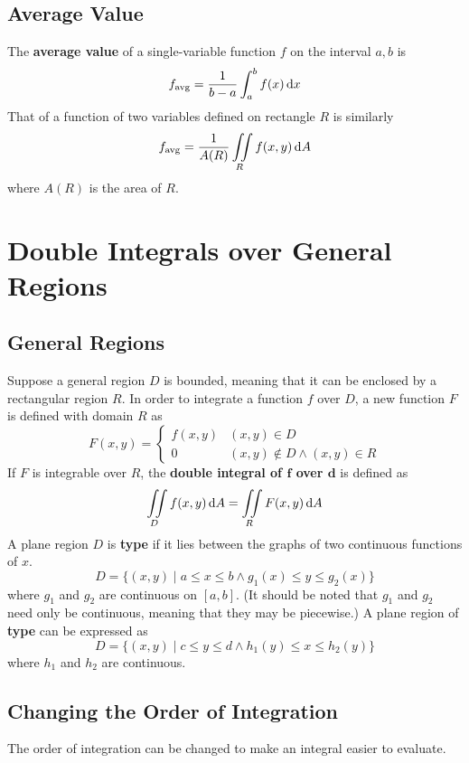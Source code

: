 \documentclass[../Calculus \Roman{3}.tex]{subfiles}
\begin{document}
		\subsection*{Average Value}
			The \textbf{average value} of a single-variable function $f$ on the interval $a, b$ is
				\[f_{\operatorname{avg}} = \frac{1}{b - a}\int_a^b f(x)\,\mathrm{d} x\]
				That of a function of two variables defined on rectangle $R$ is similarly
				\[f_{\operatorname{avg}} = \frac{1}{A(R)}\iint\limits_R f(x, y)\,\mathrm{d} A\]
				where $A(R)$ is the area of $R$.
	\section{Double Integrals over General Regions}
		\subsection*{General Regions}
			Suppose a general region $D$ is bounded, meaning that it can be enclosed by a rectangular region $R$. In order to integrate a function $f$ over $D$, a new function $F$ is defined with domain $R$ as
				\[
					F(x, y) = 
						\begin{cases}
 							f(x, y) & 
 								(x, y) \in D \\
 							0 &
 								(x, y) \notin D \land (x, y) \in R
				 		\end{cases}
				\]
				If $F$ is integrable over $R$, the \textbf{double integral of $\bm{f}$ over $\bm{d}$} is defined as
					\[\iint\limits_D f(x, y)\,\mathrm{d} A = \iint\limits_R F(x, y)\,\mathrm{d} A\]
			A plane region $D$ is \textbf{type } if it lies between the graphs of two continuous functions of $x$.
				\[D = \{(x, y) \mid a \le x \le b \land g_1(x) \le y \le g_2(x)\}\]
				where $g_1$ and $g_2$ are continuous on $[a, b]$. (It should be noted that $g_1$ and $g_2$ need only be continuous, meaning that they may be piecewise.)
			A plane region of \textbf{type } can be expressed as
				\[D = \{(x, y) \mid c \le y \le d \land h_1(y) \le x \le h_2(y)\}\]
				where $h_1$ and $h_2$ are continuous.
		\subsection*{Changing the Order of Integration}
			The order of integration can be changed to make an integral easier to evaluate.
\end{document}
